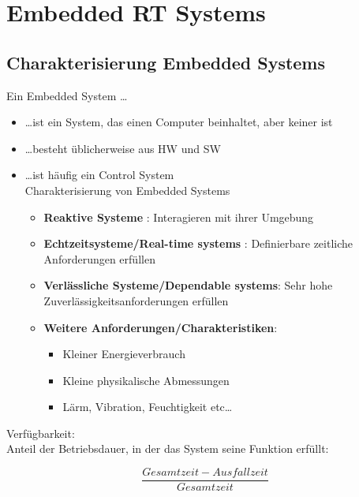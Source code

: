 \section{Embedded RT Systems }
\subsection{Charakterisierung Embedded Systems }
Ein Embedded System \ldots
\begin{itemize}
  \item \ldots ist ein System, das einen Computer beinhaltet, aber keiner ist
  \item \ldots besteht üblicherweise aus HW und SW
  \item \ldots ist häufig ein Control System\\
Charakterisierung von Embedded Systems
  \begin{itemize}
    \item \textbf{Reaktive Systeme} : Interagieren mit ihrer Umgebung
    \item \textbf{Echtzeitsysteme/Real-time systems} : Definierbare zeitliche
    Anforderungen erfüllen
    \item \textbf{Verlässliche Systeme/Dependable systems}: Sehr hohe
    Zuverlässigkeitsanforderungen erfüllen
    \item \textbf{Weitere Anforderungen/Charakteristiken}: 
    \begin{itemize}
      \item Kleiner Energieverbrauch
      \item Kleine physikalische Abmessungen
      \item Lärm, Vibration, Feuchtigkeit etc\ldots
    \end{itemize}
  \end{itemize}
\end{itemize}

Verfügbarkeit: \\ 
Anteil der Betriebsdauer, in  der das System seine Funktion
erfüllt: 

\begin{equation}
\frac{Gesamtzeit-Ausfallzeit}{Gesamtzeit}
\end{equation}

